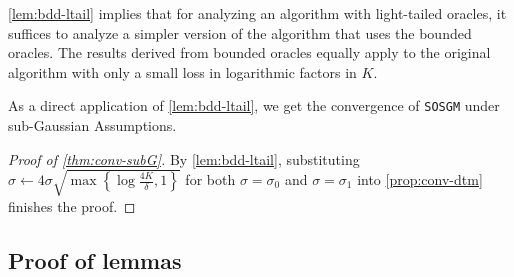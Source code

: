 \documentclass{article}
\theoremstyle{definition}
\newcommand{\sosgm}{\texttt{SOSGM}}
\begin{document}
\cref{lem:bdd-ltail} implies that for analyzing an algorithm with
light-tailed oracles, it suffices to analyze a simpler version of the
algorithm that uses the bounded oracles. The results derived from bounded
oracles equally apply to the original algorithm with only a small loss in
logarithmic factors in $K$.

As a direct application of \cref{lem:bdd-ltail}, we get the convergence of {\sosgm} under sub-Gaussian Assumptions.


\begin{proof}[Proof of \cref{thm:conv-subG}]
  By \cref{lem:bdd-ltail}, substituting $\sigma \gets 4 \sigma \sqrt{\max \left\{
  \log \tfrac{4 K}{\delta}, 1 \right\}}$ for both $\sigma=\sigma_0$ and $\sigma=\sigma_1$ into
  \cref{prop:conv-dtm} finishes the proof.
\end{proof}


\subsection{Proof of lemmas}
\end{document}
